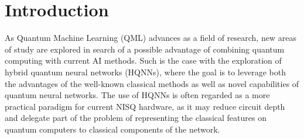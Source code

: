 
\date{\today}

\begin{abstract}

With the current advances in AI, Reinforcement Learning methods have grown in popularity for model training, representing a new learning paradigm that is currently being explored within various sectors of the financial industry. As quantum computing technologies mature, studies have investigated how the current Reinforcement Learning methods can be combined with quantum computing (QC), giving way to what is known as hybrid quantum-classical reinforcement learning approaches. We evaluate, in two important financial problems, fraud detection and portfolio optimization, how the use of a practical paradigm for NISQ (noisy intermediate scale quantum) hardware, namely hybrid quantum neural networks (HQNNs) perform when trained using reinforcement learning techniques.

\end{abstract}
\maketitle

\section{Introduction}

 As Quantum Machine Learning (QML) advances as a field of research, new areas of study are explored in search of a possible advantage of combining quantum computing with current AI methods. Such is the case with the exploration of hybrid quantum neural networks (HQNNs), where the goal is to leverage both the advantages of the well-known classical methods as well as novel capabilities of quantum neural networks. The use of HQNNs is often regarded as a more practical paradigm for current NISQ hardware, as it may reduce circuit depth and delegate part of the problem of representing the classical features on quantum computers to classical components of the network.

